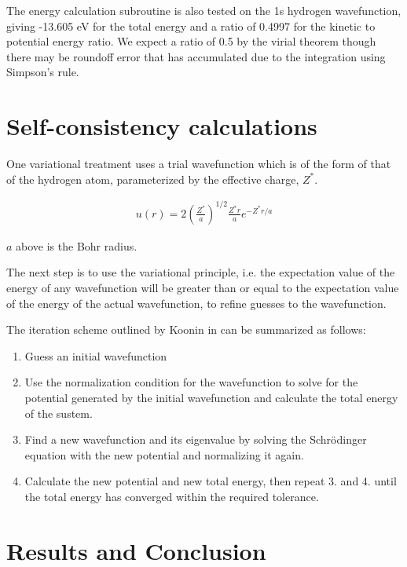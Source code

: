 \documentclass[11pt,letterpaper]{article}
\begin{document}
The energy calculation subroutine is also tested on the 1s
hydrogen wavefunction, giving -13.605 eV for the total energy and
a ratio of 0.4997 for the kinetic to potential energy ratio. We expect a ratio
of 0.5 by the virial theorem though there may be roundoff error that
has accumulated due to the integration using Simpson's rule.

\section{Self-consistency calculations}

One variational treatment uses a trial wavefunction which is 
of the form of that of the
hydrogen atom, parameterized by the effective charge, $Z^*$.

\begin{align}
u(r) = 2 \left(\frac{Z^*}{a}\right)^{1/2} \frac{Z^*r}{a} e^{-Z^*r/a}
\label{1swav}
\end{align}

$a$ above is the Bohr radius.


The next step is to use the variational principle, i.e. the expectation
value of the energy of any wavefunction will be greater than or equal to the
expectation value of the energy of the actual wavefunction, to refine guesses
to the wavefunction.

The iteration scheme outlined by Koonin in \cite[p.~74]{koonin90} 
can be summarized as follows:

\begin{enumerate}
\item Guess an initial wavefunction
\item Use the normalization condition for the wavefunction 
to solve for the potential generated by the initial wavefunction and 
calculate the total energy of the sustem.
\item Find a new wavefunction and its eigenvalue by solving the 
Schr\"{o}dinger equation with the
new potential and normalizing it again.
\item Calculate the new potential and new total energy, then repeat 
3. and 4. until the total energy has converged within the required tolerance.
\end{enumerate}

\section{Results and Conclusion}
\end{document}
